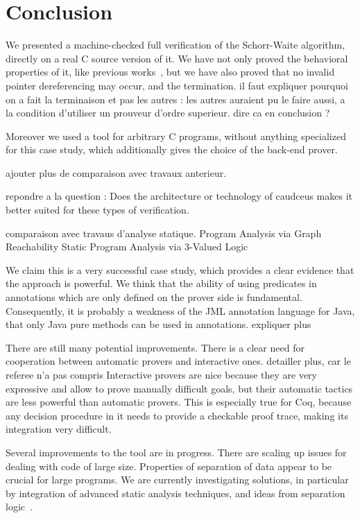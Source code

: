 \section{Conclusion}
\label{sec:conclusion}

We presented a machine-checked full verification of the Schorr-Waite
algorithm, directly on a real C source version of it. We have not only
proved the behavioral properties of it, like previous
works~\cite{bornat00mpc,mehta03cade}, but we have also proved that no
invalid pointer dereferencing may occur, and the
termination. 
{\Huge il faut expliquer pourquoi on a fait la terminaison et pas les autres : les
  autres auraient pu le faire aussi, a la condition d'utiliser un
  prouveur d'ordre superieur. dire ca en conclusion ?}


Moreover we used a tool for arbitrary C programs, without
anything specialized for this case study, which additionally gives the
choice of the back-end prover.
{\Huge ajouter plus de comparaison avec travaux anterieur. 

repondre a la question : Does the architecture or technology of
caudceus makes it better suited for these types of verification.

comparaison
  avec travaus d'analyse statique. \cite{sagiv02toplas,reps03esop} Program Analysis via Graph Reachability
Static Program Analysis via 3-Valued Logic
}

We claim this is a very successful case study, which provides a clear
evidence that the \caduceus{} approach is powerful. We think that the
ability of using predicates in annotations which are only defined on
the prover side is fundamental. Consequently, it is probably a
weakness of the JML annotation language for Java, that only Java
pure methods can be used in annotations. {\Huge expliquer plus }

There are still many potential improvements. There is a clear
need for cooperation between automatic provers and interactive
ones. {\Huge detailler plus, car le referee n'a pas compris}
Interactive provers are nice because they are very expressive and
allow to prove manually difficult goals, but their automatic tactics
are less powerful than automatic provers. This is especially true for
Coq, because any decision procedure in it needs to provide a checkable
proof trace, making its integration very difficult.

Several improvements to the \caduceus{} tool are in progress. There are
scaling up issues for dealing with code of large size. Properties of
separation of data appear to be crucial for large programs. We are
currently investigating solutions, in particular by integration of
advanced static analysis techniques, and ideas from separation
logic~\cite{reynolds02lics}.


